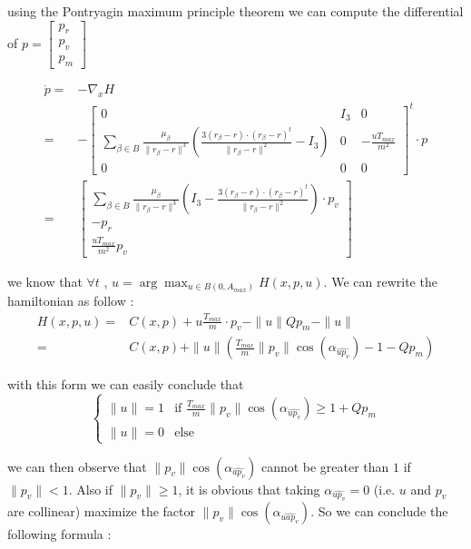 \documentclass[11pt]{article} %
\begin{document}
			using the Pontryagin maximum principle theorem we can compute the differential of $p=\begin{bmatrix}p_r\\p_v\\p_m\end{bmatrix}$
			
			$$
			\begin{align}
				\dot{p}=&-\nabla _{x}H\\
				=&-\begin{bmatrix}
					0 & I_3 & 0\\
					\sum\limits _{\beta \in B }\frac{\mu _{\beta }}{\| r_{\beta } -r\| ^{3}}\left(\frac{3( r_{\beta } -r) \cdot ( r_{\beta } -r)^{t}}{\| r_{\beta } -r\| ^{2}} -I_3\right) & 0 & -\frac{uT_ {max}}{m^2} \\
					0 & 0 & 0
				\end{bmatrix}^{t} \cdot p\\
				=&\begin{bmatrix}
					\sum\limits _{\beta \in B }\frac{\mu _{\beta }}{\| r_{\beta } -r\| ^{3}}\left(I_3-\frac{3( r_{\beta } -r) \cdot ( r_{\beta } -r)^{t}}{\| r_{\beta } -r\| ^{2}} \right)\cdot p_v\\
					-p_r\\
					\frac{uT_ {max}}{m^2}p_v
				\end{bmatrix}
			\end{align}
			$$
			
			we know that $\forall t$ , $u=\arg\max_{u\in B(0,A_{max})}H(x,p,u)$. We can rewrite the hamiltonian as follow : 
			$$
			\begin{align}
				H(x,p,u)=&C(x,p)+u\frac{T_ {max}}{m}\cdot p_v-\|u\|Qp_m-\|u\| \\
				=&C(x,p)+\|u\|(\frac{T_ {max}}{m}\|p_v\|\cos(\alpha_{\widehat{up_v}})-1-Qp_m)
			\end{align}
			$$ 
			
			with this form we can easily conclude that 
			$$
			\begin{cases}
				\| u\| =1 & \text{if } \frac{T_ {max}}{m}\|p_v\|\cos(\alpha_{\widehat{up_v}})\ge1+Qp_m\\
				\| u\| =0 & \text{else}
			\end{cases}
			$$
			
			we can then observe that $\|p_v\|\cos(\alpha_{\widehat{ap_v}})$ cannot be greater than $1$ if $\|p_v\| < 1$. Also if $\|p_v\| \ge 1$, it is obvious that taking $\alpha_{\widehat{up_v}}=0$ (i.e. $u$ and $p_v$ are collinear) maximize the factor $\|p_v\|\cos(\alpha_{\widehat{uap_v}})$. So we can conclude the following formula :
			
\end{document}
